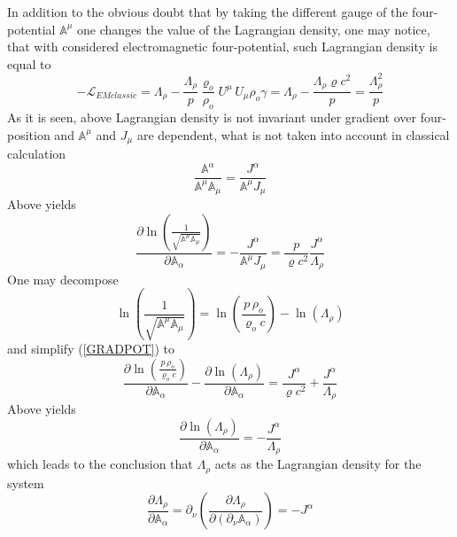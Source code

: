 \documentclass[aps,prx,preprint,groupedaddress,showkeys]{revtex4-2}
\begin{document}
In addition to the obvious doubt that by taking the different gauge of the four-potential $\mathbb{A}^{\mu}$ one changes the value of the Lagrangian density, one may notice, that with considered electromagnetic four-potential, such Lagrangian density is equal to
\begin{equation} \label{CLASSLAG2}
- \mathcal{L}_{EMclassic} = \Lambda_{\rho} - \frac{\Lambda_{\rho}}{p} \frac{\varrho_o}{\rho_o} U^{\mu} \, U_{\mu} \rho_o \gamma = \Lambda_{\rho} - \frac{\Lambda_{\rho} \varrho c^2}{p} = \frac{\Lambda_{\rho}^2}{p}
\end{equation}
As it is seen, above Lagrangian density is not invariant under gradient over four-position and $\mathbb{A}^{\mu}$ and $J_{\mu}$ are dependent, what is not taken into account in classical calculation
\begin{equation} \label{DEPENDFIELDS}
\frac{\mathbb{A}^{\alpha}}{\mathbb{A}^{\mu} \mathbb{A}_{\mu}}  = \frac{J^{\alpha}}{\mathbb{A}^{\mu} J_{\mu}} 
\end{equation}
Above yields 
\begin{equation} \label{GRADPOT}
\frac{\partial \ln{\left ( \frac{1}{\sqrt{\mathbb{A}^{\mu} \mathbb{A}_{\mu}}} \right)}}{\partial \mathbb{A}_{\alpha}} = - \frac{J^{\alpha}}{\mathbb{A}^{\mu} J_{\mu}} = \frac{p}{\varrho c^2} \frac{J^{\alpha}}{\Lambda_{\rho}}
\end{equation}
One may decompose
\begin{equation} \label{DECPOT}
\ln{\left ( \frac{1}{\sqrt{\mathbb{A}^{\mu} \mathbb{A}_{\mu}}} \right)} = \ln{\left ( \frac{p \, \rho_o }{ \varrho_o c} \right)} - \ln{\left (\Lambda_{\rho} \right ) }  
\end{equation}
and simplify (\ref{GRADPOT}) to
\begin{equation} \label{GRAFIN}
\frac{\partial \ln{\left ( \frac{p \, \rho_o }{ \varrho_o c} \right)} }{\partial \mathbb{A}_{\alpha}}  - \frac{\partial \ln{\left (\Lambda_{\rho} \right ) } }{\partial \mathbb{A}_{\alpha}} = \frac{J^{\alpha}}{\varrho c^2} + \frac{J^{\alpha}}{\Lambda_{\rho}}
\end{equation}
Above yields
\begin{equation} \label{MUINV}
\frac{\partial \ln{\left ( \Lambda_{\rho} \right ) }}{\partial \mathbb{A}_{\alpha}} = - \frac{J^{\alpha}}{\Lambda_{\rho}}
\end{equation}
which leads to the conclusion that $\Lambda_{\rho}$ acts as the Lagrangian density for the system
\begin{equation} \label{CLASSLAGNEW}
\frac{\partial \Lambda_{\rho}} {\partial \mathbb{A}_{\alpha}} =  \partial_{\nu}  \left (  \frac{\partial \Lambda_{\rho}}{\partial (\partial_{\nu} \mathbb{A}_{\alpha} )}   \right ) = - J^{\alpha}
\end{equation}
\end{document}
